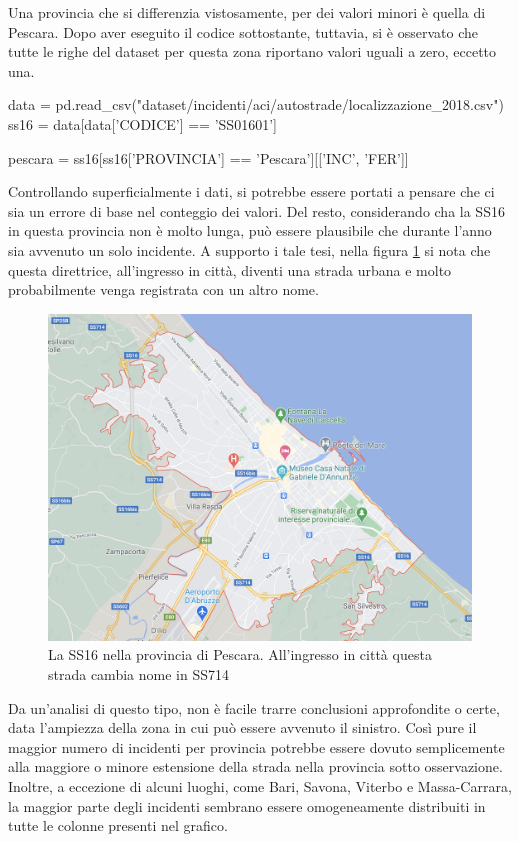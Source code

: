 \documentclass[a4paper]{report}
\begin{document}
Una provincia che si differenzia vistosamente, per dei valori minori è quella di Pescara. 
Dopo aver eseguito il codice sottostante, tuttavia, si è osservato che tutte le righe 
del dataset per questa zona riportano valori uguali a zero, eccetto una. 

\begin{code}
data = pd.read_csv("dataset/incidenti/aci/autostrade/localizzazione_2018.csv")
ss16 = data[data['CODICE'] == 'SS01601']

pescara = ss16[ss16['PROVINCIA'] == 'Pescara'][['INC', 'FER']]
\end{code}

Controllando superficialmente i dati, si potrebbe essere portati a pensare 
che ci sia un errore di base nel conteggio dei valori. 
Del resto, considerando cha la SS16 in questa provincia non è molto lunga, 
può essere plausibile che durante l'anno sia avvenuto un solo incidente. 
A supporto i tale tesi, nella figura \ref{fig:ss16-pescara} si nota che questa direttrice, 
all'ingresso in città, diventi una strada urbana e molto probabilmente venga 
registrata con un altro nome.

\begin{figure}
    \hfill\includegraphics[width=0.7\linewidth]{img/pescara_ss16.png}\hspace*{\fill}
    \caption{La SS16 nella provincia di Pescara. All'ingresso in città questa strada cambia nome in SS714}
    \label{fig:ss16-pescara}
\end{figure}

Da un'analisi di questo tipo, non è facile trarre conclusioni approfondite 
o certe, data l'ampiezza della zona in cui può essere avvenuto il sinistro. 
Così pure il maggior numero di incidenti per provincia potrebbe essere dovuto 
semplicemente alla maggiore o minore estensione della strada nella 
provincia sotto osservazione. 
Inoltre, a eccezione di alcuni luoghi, come Bari, Savona, Viterbo e Massa-Carrara, 
la maggior parte degli incidenti sembrano essere omogeneamente distribuiti 
in tutte le colonne presenti nel grafico. 
\end{document}
